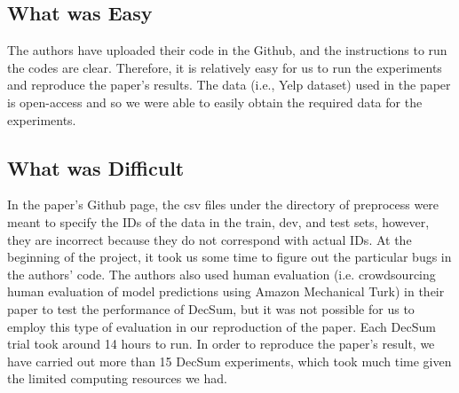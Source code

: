 \documentclass{article}
\begin{document}
\subsection{What was Easy}
The authors have uploaded their code in the Github, and the instructions to run the codes are clear. Therefore, it is relatively easy for us to run the experiments and reproduce the paper’s results.
The data (i.e., Yelp dataset) used in the paper is open-access and so we were able to easily obtain the required data for the experiments.

\subsection{What was Difficult}
In the paper’s Github page, the csv files under the directory of preprocess were meant to specify the IDs of the data in the train, dev, and test sets, however, they are incorrect because
they do not correspond with actual IDs.
At the beginning of the project, it took us some time to figure out the particular bugs in the authors' code. The authors also used human evaluation (i.e. crowdsourcing human evaluation of model
predictions using Amazon Mechanical Turk) in their paper to test the performance of DecSum, but it was not possible for us to employ this type of evaluation in our reproduction of the paper. Each
DecSum trial took around 14 hours to run. In order to reproduce the paper’s result, we have carried out more than 15 DecSum experiments, which took much time given the limited computing resources we
had.
\end{document}
